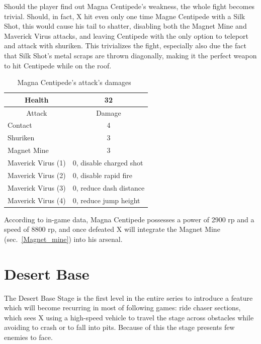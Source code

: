 Should the player find out Magna Centipede's weakness, the whole fight becomes trivial. Should, in fact, X hit even only one time Magne Centipede with a Silk Shot, this would cause his tail to shatter, disabling both the Magnet Mine and Maverick Virus attacks, and leaving Centipede with the only option to teleport and attack with shuriken. This trivializes the fight, especially also due the fact that Silk Shot's metal scraps are thrown diagonally, making it the perfect weapon to hit Centipede while on the roof.
\begin{table}[htp]
	\centering
	\begin{tabular}[h]{l c}
		\toprule
		\multicolumn{1}{c}{Health}  & 32 \\
		\midrule
		\multicolumn{1}{c}{Attack} & \multicolumn{1}{c}{Damage}\\
		Contact & 4 \\
		Shuriken & 3\\
		Magnet Mine& 3\\
		Maverick Virus (1) & \multicolumn{1}{l}{0, disable charged shot}\\
		Maverick Virus (2) & \multicolumn{1}{l}{0, disable rapid fire}\\
		Maverick Virus (3) & \multicolumn{1}{l}{0, reduce dash distance}\\
		Maverick Virus (4) & \multicolumn{1}{l}{0, reduce jump height}\\
		\bottomrule
	\end{tabular}
	\caption{Magna Centipede's attack's damages~\cite{wiki:Magna_centipede}}
\end{table}
According to in-game data, Magna Centipede possesses a power of 2900 rp and a speed of 8800 rp, and once defeated X will integrate the Magnet Mine (sec.~\ref{Magnet_mine}) into his arsenal.



\section{Desert Base}
The Desert Base Stage is the first level in the entire series to introduce a feature which will become recurring in most of following games: ride chaser sections, which sees X using a high-speed vehicle to travel the stage across obstacles while avoiding to crash or to fall into pits. Because of this the stage presents few enemies to face.

